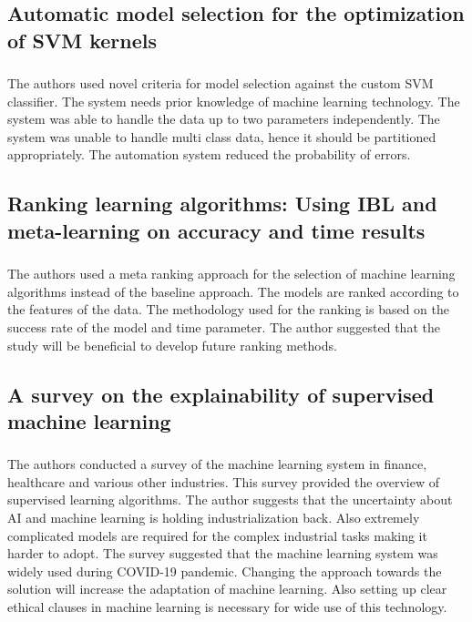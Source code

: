 \subsection{Automatic model selection for the optimization of SVM kernels}
\subsubsection{\citeauthor*{ref_paper_3} \citeyearpar{ref_paper_3}}

The authors used novel criteria for model selection against the custom SVM classifier. The system needs prior knowledge of machine learning technology. The system was able to handle the data up to two parameters independently. The system was unable to handle multi class data, hence it should be partitioned appropriately. The automation system reduced the probability of errors.

\subsection{Ranking learning algorithms: Using IBL and meta-learning on accuracy and time results}
\subsubsection{\citeauthor*{ref_paper_23} \citeyearpar{ref_paper_23}}

The authors used a meta ranking approach for the selection of machine learning algorithms instead of the baseline approach. The models are ranked according to the features of the data. The methodology used for the ranking is based on the success rate of the model and time parameter. The author suggested that the study will be beneficial to develop future ranking methods.

\subsection{A survey on the explainability of supervised machine learning}
\subsubsection{\citeauthor*{ref_paper_14} \citeyearpar{ref_paper_14}}

The authors conducted a survey of the machine learning system in finance, healthcare and various other industries. This survey provided the overview of supervised learning algorithms. The author suggests that the uncertainty about AI and machine learning is holding industrialization back. Also extremely complicated models are required for the complex industrial tasks making it harder to adopt. The survey suggested that the machine learning system was widely used during COVID-19 pandemic. Changing the approach towards the solution will increase the adaptation of machine learning. Also setting up clear ethical clauses in machine learning is necessary for wide use of this technology.


